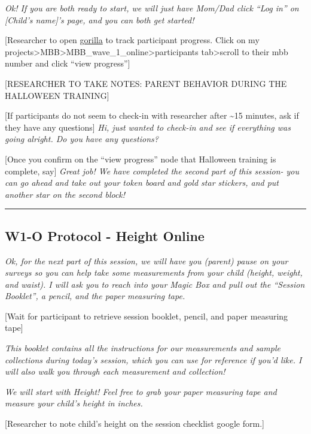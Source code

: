 \documentclass[
]{book}
\begin{document}
\emph{Ok! If you are both ready to start, we will just have Mom/Dad click ``Log in'' on {[}Child's name{]}'s page, and you can both get started!}

{[}Researcher to open \href{https://gorilla.sc}{gorilla} to track participant progress. Click on my projects\textgreater MBB\textgreater MBB\_wave\_1\_online\textgreater participants tab\textgreater scroll to their mbb number and click ``view progress''{]}

{[}RESEARCHER TO TAKE NOTES: PARENT BEHAVIOR DURING THE HALLOWEEN TRAINING{]}

{[}If participants do not seem to check-in with researcher after \textasciitilde15 minutes, ask if they have any questions{]} \emph{Hi, just wanted to check-in and see if everything was going alright. Do you have any questions?}

{[}Once you confirm on the ``view progress'' node that Halloween training is complete, say{]} \emph{Great job! We have completed the second part of this session- you can go ahead and take out your token board and gold star stickers, and put another star on the second block!}

\begin{center}\rule{0.5\linewidth}{0.5pt}\end{center}

\hypertarget{w1-o-protocol---height-online}{%
\subsection{W1-O Protocol - Height Online}\label{w1-o-protocol---height-online}}

\emph{Ok, for the next part of this session, we will have you (parent) pause on your surveys so you can help take some measurements from your child (height, weight, and waist). I will ask you to reach into your Magic Box and pull out the ``Session Booklet'', a pencil, and the paper measuring tape.}

{[}Wait for participant to retrieve session booklet, pencil, and paper measuring tape{]}

\emph{This booklet contains all the instructions for our measurements and sample collections during today's session, which you can use for reference if you'd like. I will also walk you through each measurement and collection!}

\emph{We will start with Height! Feel free to grab your paper measuring tape and measure your child's height in inches.}

{[}Researcher to note child's height on the session checklist google form.{]}
\end{document}
